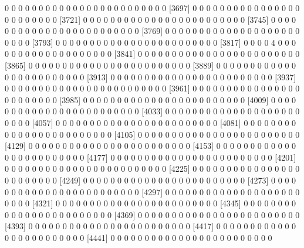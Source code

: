\documentclass[11pt]{article}
\begin{document}
\begin{Schunk}
\begin{Soutput}
 [3673]  0  0  0  0  0  0  0  0  0  0  0  0  0  0  0  0  0  0  0  0  0  0  0  0
 [3697]  0  0  0  0  0  0  0  0  0  0  0  0  0  0  0  0  0  0  0  0  0  0  0  0
 [3721]  0  0  0  0  0  0  0  0  0  0  0  0  0  0  0  0  0  0  0  0  0  0  0  0
 [3745]  0  0  0  0  0  0  0  0  0  0  0  0  0  0  0  0  0  0  0  0  0  0  0  0
 [3769]  0  0  0  0  0  0  0  0  0  0  0  0  0  0  0  0  0  0  0  0  0  0  0  0
 [3793]  0  0  0  0  0  0  0  0  0  0  0  0  0  0  0  0  0  0  0  0  0  0  0  0
 [3817]  0  0  0  0  4  0  0  0  0  0  0  0  0  0  0  0  0  0  0  0  0  0  0  0
 [3841]  0  0  0  0  0  0  0  0  0  0  0  0  0  0  0  0  0  0  0  0  0  0  0  0
 [3865]  0  0  0  0  0  0  0  0  0  0  0  0  0  0  0  0  0  0  0  0  0  0  0  0
 [3889]  0  0  0  0  0  0  0  0  0  0  0  0  0  0  0  0  0  0  0  0  0  0  0  0
 [3913]  0  0  0  0  0  0  0  0  0  0  0  0  0  0  0  0  0  0  0  0  0  0  0  0
 [3937]  0  0  0  0  0  0  0  0  0  0  0  0  0  0  0  0  0  0  0  0  0  0  0  0
 [3961]  0  0  0  0  0  0  0  0  0  0  0  0  0  0  0  0  0  0  0  0  0  0  0  0
 [3985]  0  0  0  0  0  0  0  0  0  0  0  0  0  0  0  0  0  0  0  0  0  0  0  0
 [4009]  0  0  0  0  0  0  0  0  0  0  0  0  0  0  0  0  0  0  0  0  0  0  0  0
 [4033]  0  0  0  0  0  0  0  0  0  0  0  0  0  0  0  0  0  0  0  0  0  0  0  0
 [4057]  0  0  0  0  0  0  0  0  0  0  0  0  0  0  0  0  0  0  0  0  0  0  0  0
 [4081]  0  0  0  0  0  0  0  0  0  0  0  0  0  0  0  0  0  0  0  0  0  0  0  0
 [4105]  0  0  0  0  0  0  0  0  0  0  0  0  0  0  0  0  0  0  0  0  0  0  0  0
 [4129]  0  0  0  0  0  0  0  0  0  0  0  0  0  0  0  0  0  0  0  0  0  0  0  0
 [4153]  0  0  0  0  0  0  0  0  0  0  0  0  0  0  0  0  0  0  0  0  0  0  0  0
 [4177]  0  0  0  0  0  0  0  0  0  0  0  0  0  0  0  0  0  0  0  0  0  0  0  0
 [4201]  0  0  0  0  0  0  0  0  0  0  0  0  0  0  0  0  0  0  0  0  0  0  0  0
 [4225]  0  0  0  0  0  0  0  0  0  0  0  0  0  0  0  0  0  0  0  0  0  0  0  0
 [4249]  0  0  0  0  0  0  0  0  0  0  0  0  0  0  0  0  0  0  0  0  0  0  0  0
 [4273]  0  0  0  0  0  0  0  0  0  0  0  0  0  0  0  0  0  0  0  0  0  0  0  0
 [4297]  0  0  0  0  0  0  0  0  0  0  0  0  0  0  0  0  0  0  0  0  0  0  0  0
 [4321]  0  0  0  0  0  0  0  0  0  0  0  0  0  0  0  0  0  0  0  0  0  0  0  0
 [4345]  0  0  0  0  0  0  0  0  0  0  0  0  0  0  0  0  0  0  0  0  0  0  0  0
 [4369]  0  0  0  0  0  0  0  0  0  0  0  0  0  0  0  0  0  0  0  0  0  0  0  0
 [4393]  0  0  0  0  0  0  0  0  0  0  0  0  0  0  0  0  0  0  0  0  0  0  0  0
 [4417]  0  0  0  0  0  0  0  0  0  0  0  0  0  0  0  0  0  0  0  0  0  0  0  0
 [4441]  0  0  0  0  0  0  0  0  0  0  0  0  0  0  0  0  0  0  0  0  0  0  0  0

\end{Soutput}
\end{Schunk}
\end{document}
